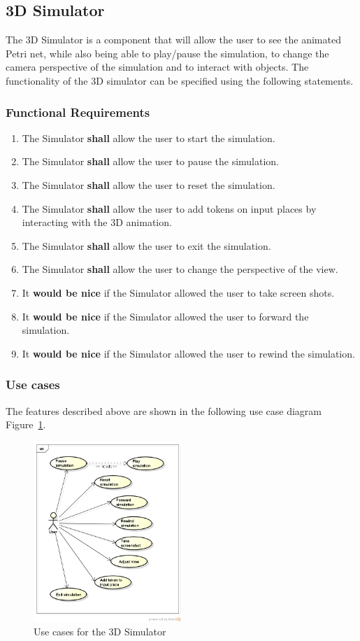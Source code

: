 \subsection{3D Simulator}
\label{sec:sf-simulator}

The 3D Simulator is a component that will allow the user to see the animated Petri net, while also being able to play/pause the simulation, to change the camera perspective of the simulation and to interact with objects. The functionality of the 3D simulator can be specified using the following statements.

\subsubsection{Functional Requirements}
\begin{enumerate}
\item The Simulator \textbf{shall} allow the user to start the simulation.
\item The Simulator \textbf{shall} allow the user to pause the simulation.
\item The Simulator \textbf{shall} allow the user to reset the simulation.
\item The Simulator \textbf{shall} allow the user to add tokens on input places by interacting with the 3D animation.
\item The Simulator \textbf{shall} allow the user to exit the simulation.
\item The Simulator \textbf{shall} allow the user to change the perspective of the view.
\item It \textbf{would be nice} if the Simulator allowed the user to take screen shots.
\item It \textbf{would be nice} if the Simulator allowed the user to forward the simulation.
\item It \textbf{would be nice} if the Simulator allowed the user to rewind the simulation.
\end{enumerate}

\subsubsection{Use cases}

The features described above are shown in the following use case diagram Figure~\ref{fig:use-cases-simulator}.

\begin{figure}[htp]
\begin{center}
  \includegraphics[width=0.5\textwidth]{image/uc-simulator.png}
  \caption{Use cases for the 3D Simulator}
  \label{fig:use-cases-simulator}
\end{center}
\end{figure}